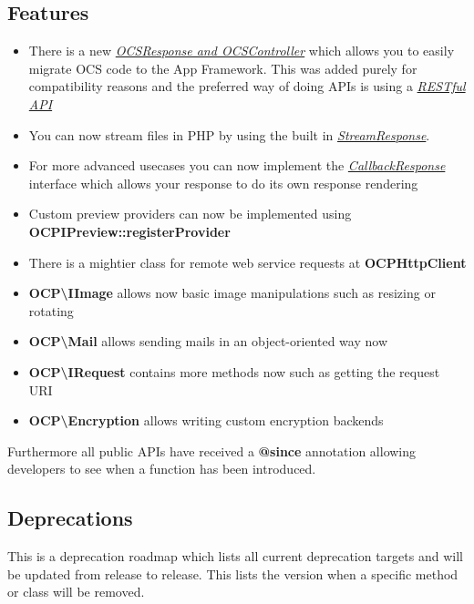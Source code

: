 \documentclass[letterpaper,10pt,english]{sphinxmanual}
\begin{document}
\subsection{Features}
\label{app/changelog:features}\begin{itemize}
\item {} 
There is a new {\hyperref[app/controllers::doc]{\emph{\emph{OCSResponse and OCSController}}}} which allows you to easily migrate OCS code to the App Framework. This was added purely for compatibility reasons and the preferred way of doing APIs is using a {\hyperref[app/api::doc]{\emph{\emph{RESTful API}}}}

\item {} 
You can now stream files in PHP by using the built in {\hyperref[app/controllers::doc]{\emph{\emph{StreamResponse}}}}.

\item {} 
For more advanced usecases you can now implement the {\hyperref[app/controllers::doc]{\emph{\emph{CallbackResponse}}}} interface which allows your response to do its own response rendering

\item {} 
Custom preview providers can now be implemented using \textbf{OCPIPreview::registerProvider}

\item {} 
There is a mightier class for remote web service requests at \textbf{OCPHttpClient}

\item {} 
\textbf{OCP\textbackslash{}IImage} allows now basic image manipulations such as resizing or rotating

\item {} 
\textbf{OCP\textbackslash{}Mail} allows sending mails in an object-oriented way now

\item {} 
\textbf{OCP\textbackslash{}IRequest} contains more methods now such as getting the request URI

\item {} 
\textbf{OCP\textbackslash{}Encryption} allows writing custom encryption backends

\end{itemize}

Furthermore all public APIs have received a \textbf{@since} annotation allowing developers to see when a function has been introduced.


\subsection{Deprecations}
\label{app/changelog:deprecations}
This is a deprecation roadmap which lists all current deprecation targets and will be updated from release to release. This lists the version when a specific method or class will be removed.
\end{document}
